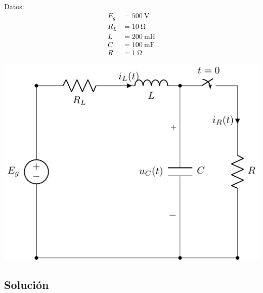 \documentclass[12pt]{article}
\begin{document}
\begin{minipage}{0.3\textwidth}
Datos:
\begin{align*}
  E_g &= \SI{500}{\volt}\\
  R_{L}&= \SI{10}{\ohm}\\
  L &= \SI{200}{\milli\henry}\\
  C &= \SI{100}{\milli\farad}\\
  R &= \SI{1}{\ohm}
\end{align*}
\end{minipage}
\begin{minipage}{0.7\textwidth}
\includegraphics{figs/E2_circuito.pdf}
\end{minipage}

\clearpage

\subsection*{Solución}
\end{document}
